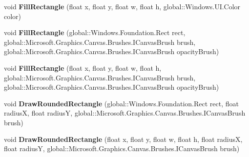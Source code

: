 \begin{DoxyCompactItemize}
\mbox{\label{interface_microsoft_1_1_graphics_1_1_canvas_1_1_i_canvas_drawing_session_a48d32f42bda232e54791b004f6a8f5bd}} 
void {\bfseries Fill\+Rectangle} (float x, float y, float w, float h, global\+::\+Windows.\+U\+I.\+Color color)
\item 
\mbox{\label{interface_microsoft_1_1_graphics_1_1_canvas_1_1_i_canvas_drawing_session_a519f2365cff391980d84e50b7fd2f444}} 
void {\bfseries Fill\+Rectangle} (global\+::\+Windows.\+Foundation.\+Rect rect, global\+::\+Microsoft.\+Graphics.\+Canvas.\+Brushes.\+I\+Canvas\+Brush brush, global\+::\+Microsoft.\+Graphics.\+Canvas.\+Brushes.\+I\+Canvas\+Brush opacity\+Brush)
\item 
\mbox{\label{interface_microsoft_1_1_graphics_1_1_canvas_1_1_i_canvas_drawing_session_abb7c5787d15df087bbf5ae6bb24d087b}} 
void {\bfseries Fill\+Rectangle} (float x, float y, float w, float h, global\+::\+Microsoft.\+Graphics.\+Canvas.\+Brushes.\+I\+Canvas\+Brush brush, global\+::\+Microsoft.\+Graphics.\+Canvas.\+Brushes.\+I\+Canvas\+Brush opacity\+Brush)
\item 
\mbox{\label{interface_microsoft_1_1_graphics_1_1_canvas_1_1_i_canvas_drawing_session_a9d0d5982cb35d8ea63a4e8c9878c2fc4}} 
void {\bfseries Draw\+Rounded\+Rectangle} (global\+::\+Windows.\+Foundation.\+Rect rect, float radiusX, float radiusY, global\+::\+Microsoft.\+Graphics.\+Canvas.\+Brushes.\+I\+Canvas\+Brush brush)
\item 
\mbox{\label{interface_microsoft_1_1_graphics_1_1_canvas_1_1_i_canvas_drawing_session_a70be22ced94e9f343568d5bb37eb2867}} 
void {\bfseries Draw\+Rounded\+Rectangle} (float x, float y, float w, float h, float radiusX, float radiusY, global\+::\+Microsoft.\+Graphics.\+Canvas.\+Brushes.\+I\+Canvas\+Brush brush)
\item 
\mbox{\label{interface_microsoft_1_1_graphics_1_1_canvas_1_1_i_canvas_drawing_session_a51d1664608a745f34514157c95465798}} 

\end{DoxyCompactItemize}
